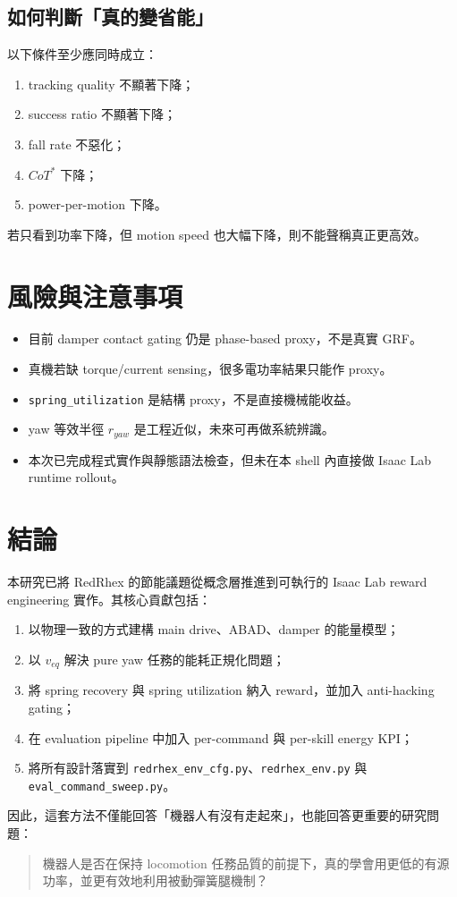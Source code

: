 \documentclass[12pt,a4paper,UTF8]{ctexart}
\begin{document}
\subsection{如何判斷「真的變省能」}

以下條件至少應同時成立：
\begin{enumerate}[leftmargin=2em]
    \item tracking quality 不顯著下降；
    \item success ratio 不顯著下降；
    \item fall rate 不惡化；
    \item $CoT^*$ 下降；
    \item power-per-motion 下降。
\end{enumerate}

若只看到功率下降，但 motion speed 也大幅下降，則不能聲稱真正更高效。

\section{風險與注意事項}

\begin{itemize}[leftmargin=2em]
    \item 目前 damper contact gating 仍是 phase-based proxy，不是真實 GRF。
    \item 真機若缺 torque/current sensing，很多電功率結果只能作 proxy。
    \item \texttt{spring\_utilization} 是結構 proxy，不是直接機械能收益。
    \item yaw 等效半徑 $r_{yaw}$ 是工程近似，未來可再做系統辨識。
    \item 本次已完成程式實作與靜態語法檢查，但未在本 shell 內直接做 Isaac Lab runtime rollout。
\end{itemize}

\section{結論}

本研究已將 RedRhex 的節能議題從概念層推進到可執行的 Isaac Lab reward engineering 實作。其核心貢獻包括：
\begin{enumerate}[leftmargin=2em]
    \item 以物理一致的方式建構 main drive、ABAD、damper 的能量模型；
    \item 以 $v_{eq}$ 解決 pure yaw 任務的能耗正規化問題；
    \item 將 spring recovery 與 spring utilization 納入 reward，並加入 anti-hacking gating；
    \item 在 evaluation pipeline 中加入 per-command 與 per-skill energy KPI；
    \item 將所有設計落實到 \texttt{redrhex\_env\_cfg.py}、\texttt{redrhex\_env.py} 與 \texttt{eval\_command\_sweep.py}。
\end{enumerate}

因此，這套方法不僅能回答「機器人有沒有走起來」，也能回答更重要的研究問題：
\begin{quote}
機器人是否在保持 locomotion 任務品質的前提下，真的學會用更低的有源功率，並更有效地利用被動彈簧腿機制？
\end{quote}
\end{document}
